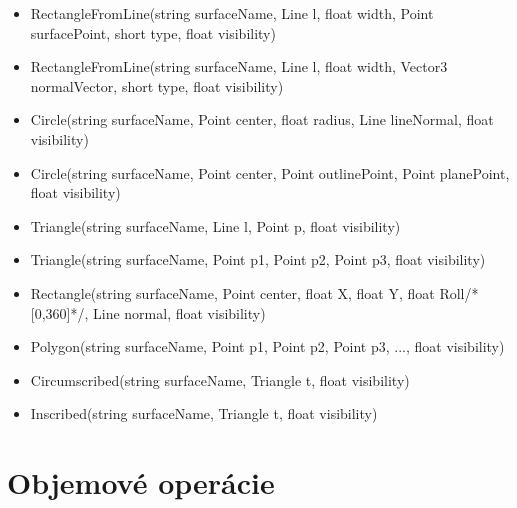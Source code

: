\begin{itemize}

	\item RectangleFromLine(string surfaceName, Line l, float width, Point surfacePoint, short type, float visibility)
	
	\item RectangleFromLine(string surfaceName, Line l, float width, Vector3 normalVector, short type, float visibility)

	\item Circle(string surfaceName, Point center, float radius, Line lineNormal, float visibility)
	
	\item Circle(string surfaceName, Point center, Point outlinePoint, Point planePoint, float visibility)

	\item Triangle(string surfaceName, Line l, Point p, float visibility)
	
	\item Triangle(string surfaceName, Point p1, Point p2, Point p3, float visibility)


	\item Rectangle(string surfaceName, Point center, float X, float Y, float Roll/*[0,360]*/, Line normal, float visibility)

	\item Polygon(string surfaceName, Point p1, Point p2, Point p3, ..., float visibility)


	\item Circumscribed(string surfaceName, Triangle t, float visibility) 
	
	\item Inscribed(string surfaceName, Triangle t, float visibility)		
	
\end{itemize}
\section{Objemové operácie}

